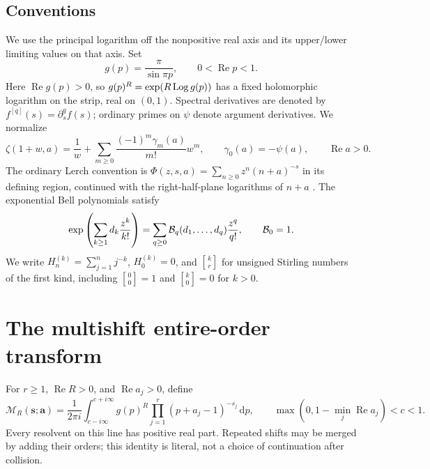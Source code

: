 \documentclass[11pt,letterpaper]{article}
\theoremstyle{definition}\newtheorem{definition}[theorem]{Definition}
\theoremstyle{remark}\newtheorem{remark}[theorem]{Remark}
\newcommand{\Rea}{\operatorname{Re}}\newcommand{\Ima}{\operatorname{Im}}
\newcommand{\dd}{\,\mathrm d}\newcommand{\M}{\mathcal M}
\newcommand{\stir}[2]{\genfrac{[}{]}{0pt}{}{#1}{#2}}
\begin{document}
\subsection{Conventions}
We use the principal logarithm off the nonpositive real axis and its
upper/lower limiting values on that axis. Set
\begin{equation}\label{mr:eq:g}
 g(p)=\frac\pi{\sin\pi p},\qquad 0<\Rea p<1.
\end{equation}
Here $\Rea g(p)>0$, so $g(p)^R=\exp(R\operatorname{Log} g(p))$ has a fixed
holomorphic logarithm on the strip, real on $(0,1)$.
Spectral derivatives are denoted by $f^{[q]}(s)=\partial_s^q f(s)$;
ordinary primes on $\psi$ denote argument derivatives. We normalize
\begin{equation}\label{mr:eq:stieltjes}
 \zeta(1+w,a)=\frac1w+\sum_{m\ge0}\frac{(-1)^m\gamma_m(a)}{m!}w^m,
 \qquad \gamma_0(a)=-\psi(a),\qquad\Rea a>0.
\end{equation}
The ordinary Lerch convention is
$\Phi(z,s,a)=\sum_{n\ge0}z^n(n+a)^{-s}$ in its defining region,
continued with the right-half-plane logarithms of $n+a$ \cite{Lerch,Zeta}.
The exponential Bell polynomials satisfy
\begin{equation}\label{mr:eq:bell}
 \exp\left(\sum_{k\ge1}d_k\frac{z^k}{k!}\right)
 =\sum_{q\ge0}\mathcal B_q(d_1,\ldots,d_q)\frac{z^q}{q!},\qquad\mathcal B_0=1.
\end{equation}
We write $H_n^{(k)}=\sum_{j=1}^n j^{-k}$, $H_0^{(k)}=0$,
and $\stir{k}{r}$ for unsigned Stirling numbers of the first kind,
including $\stir00=1$ and $\stir{k}{0}=0$ for $k>0$.

\section{The multishift entire-order transform}
\label{mr:sec:master}
For $r\ge1$, $\Rea R>0$, and $\Rea a_j>0$, define
\begin{equation}\label{mr:eq:master}
 \M_R(\boldsymbol s;\boldsymbol a)=\frac1{2\pi i}
 \int_{c-i\infty}^{c+i\infty}g(p)^R
       \prod_{j=1}^r(p+a_j-1)^{-s_j}\dd p,
 \qquad\max(0,1-\min_j\Rea a_j)<c<1.
\end{equation}
Every resolvent on this line has positive real part. Repeated shifts
may be merged by adding their orders; this identity is literal, not a
choice of continuation after collision.
\end{document}
